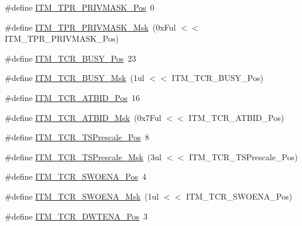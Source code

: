 \begin{DoxyCompactItemize}
\item 
\#define \hyperlink{group___c_m_s_i_s___c_m3___i_t_m_ga7abe5e590d1611599df87a1884a352e8}{I\+T\+M\+\_\+\+T\+P\+R\+\_\+\+P\+R\+I\+V\+M\+A\+S\+K\+\_\+\+Pos}~0
\item 
\#define \hyperlink{group___c_m_s_i_s___c_m3___i_t_m_ga168e089d882df325a387aab3a802a46b}{I\+T\+M\+\_\+\+T\+P\+R\+\_\+\+P\+R\+I\+V\+M\+A\+S\+K\+\_\+\+Msk}~(0x\+Ful $<$$<$ I\+T\+M\+\_\+\+T\+P\+R\+\_\+\+P\+R\+I\+V\+M\+A\+S\+K\+\_\+\+Pos)
\item 
\#define \hyperlink{group___c_m_s_i_s___c_m3___i_t_m_ga9174ad4a36052c377cef4e6aba2ed484}{I\+T\+M\+\_\+\+T\+C\+R\+\_\+\+B\+U\+S\+Y\+\_\+\+Pos}~23
\item 
\#define \hyperlink{group___c_m_s_i_s___c_m3___i_t_m_ga43ad7cf33de12f2ef3a412d4f354c60f}{I\+T\+M\+\_\+\+T\+C\+R\+\_\+\+B\+U\+S\+Y\+\_\+\+Msk}~(1ul $<$$<$ I\+T\+M\+\_\+\+T\+C\+R\+\_\+\+B\+U\+S\+Y\+\_\+\+Pos)
\item 
\#define \hyperlink{group___c_m_s_i_s___c_m3___i_t_m_gad5a179af7ad1f2b8958e50907186529b}{I\+T\+M\+\_\+\+T\+C\+R\+\_\+\+A\+T\+B\+I\+D\+\_\+\+Pos}~16
\item 
\#define \hyperlink{group___c_m_s_i_s___c_m3___i_t_m_ga491d8bddbe6c0523ff10ef6d2846f0f2}{I\+T\+M\+\_\+\+T\+C\+R\+\_\+\+A\+T\+B\+I\+D\+\_\+\+Msk}~(0x7\+Ful $<$$<$ I\+T\+M\+\_\+\+T\+C\+R\+\_\+\+A\+T\+B\+I\+D\+\_\+\+Pos)
\item 
\#define \hyperlink{group___c_m_s_i_s___c_m3___i_t_m_gad7bc9ee1732032c6e0de035f0978e473}{I\+T\+M\+\_\+\+T\+C\+R\+\_\+\+T\+S\+Prescale\+\_\+\+Pos}~8
\item 
\#define \hyperlink{group___c_m_s_i_s___c_m3___i_t_m_ga7a723f71bfb0204c264d8dbe8cc7ae52}{I\+T\+M\+\_\+\+T\+C\+R\+\_\+\+T\+S\+Prescale\+\_\+\+Msk}~(3ul $<$$<$ I\+T\+M\+\_\+\+T\+C\+R\+\_\+\+T\+S\+Prescale\+\_\+\+Pos)
\item 
\#define \hyperlink{group___c_m_s_i_s___c_m3___i_t_m_ga7a380f0c8078f6560051406583ecd6a5}{I\+T\+M\+\_\+\+T\+C\+R\+\_\+\+S\+W\+O\+E\+N\+A\+\_\+\+Pos}~4
\item 
\#define \hyperlink{group___c_m_s_i_s___c_m3___i_t_m_ga97476cb65bab16a328b35f81fd02010a}{I\+T\+M\+\_\+\+T\+C\+R\+\_\+\+S\+W\+O\+E\+N\+A\+\_\+\+Msk}~(1ul $<$$<$ I\+T\+M\+\_\+\+T\+C\+R\+\_\+\+S\+W\+O\+E\+N\+A\+\_\+\+Pos)
\item 
\#define \hyperlink{group___c_m_s_i_s___c_m3___i_t_m_ga30e83ebb33aa766070fe3d1f27ae820e}{I\+T\+M\+\_\+\+T\+C\+R\+\_\+\+D\+W\+T\+E\+N\+A\+\_\+\+Pos}~3
\item 
$$
\end{DoxyCompactItemize}
